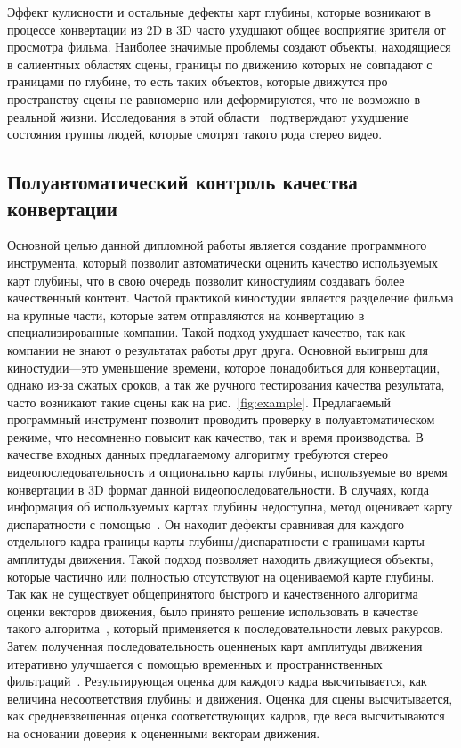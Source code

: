 \documentclass[12pt, a4paper]{article}
\begin{document}
Эффект кулисности и остальные дефекты карт глубины, которые возникают в процессе 
конвертации из 2D в 3D часто ухудшают общее восприятие зрителя от просмотра фильма. 
Наиболее значимые проблемы создают объекты, находящиеся в салиентных областях 
сцены, границы по движению которых не совпадают с границами по глубине, то есть 
таких объектов, которые движутся про пространству сцены не равномерно или деформируются, 
что не возможно в реальной жизни. Исследования в этой области~\cite{jung2012visual,li2014visual} подтверждают ухудшение состояния группы людей, которые смотрят такого рода стерео видео.

\subsection{Полуавтоматический контроль качества конвертации}



Основной целью данной дипломной работы является создание программного инструмента, 
который позволит автоматически оценить качество используемых карт глубины,
что в свою очередь позволит киностудиям создавать более качественный контент. 
Частой практикой киностудии является разделение фильма на крупные части, которые 
затем отправляются на конвертацию в специализированные компании. Такой подход 
ухудшает качество, так как компании не знают о результатах работы друг друга. 
Основной выигрыш для киностудии---это уменьшение времени, которое понадобиться 
для конвертации, однако из-за сжатых сроков, а так же ручного тестирования 
качества результата, часто возникают такие сцены как на рис.~\ref{fig:example}. 
Предлагаемый программный инструмент позволит проводить проверку в полуавтоматическом 
режиме, что несомненно повысит как качество, так и время производства.
В качестве входных данных предлагаемому алгоритму требуются стерео видеопоследовательность 
и опционально карты глубины, используемые во время конвертации в 3D формат данной видеопоследовательности. В случаях, когда информация об используемых картах 
глубины недоступна, метод оценивает карту диспаратности с помощью~\cite{simonyan2008fast,zhang2014100+}. Он находит дефекты сравнивая 
для каждого отдельного кадра границы карты глубины/диспаратности с границами карты 
амплитуды движения. Такой подход позволяет находить движущиеся объекты, которые 
частично или полностью отсутствуют на оцениваемой карте глубины. Так как не существует 
общепринятого быстрого и качественного алгоритма оценки векторов движения, было принято 
решение использовать в качестве такого алгоритма~\cite{simonyan2008fast}, который 
применяется к последовательности левых ракурсов. Затем полученная последовательность 
оценненых карт амплитуды движения итеративно улучшается с помощью временных и 
пространнственных фильтраций~\cite{fecker2007time,matyunin2011temporal,he2013guided}. 
Результирующая оценка для каждого кадра высчитывается, как величина несоответствия 
глубины и движения. Оценка для сцены высчитывается, как средневзвешенная оценка 
соответствующих кадров, где веса высчитываются на основании доверия 
к оцененными векторам движения.
\end{document}
